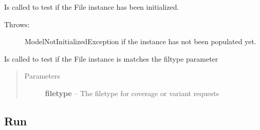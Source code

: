 \documentclass[letterpaper,10pt,english]{sphinxmanual}
\begin{document}
\begin{fulllineitems}
\begin{fulllineitems}
\end{fulllineitems}


\begin{fulllineitems}
\label{Available modules:BaseSpacePy.model.File.File.isInit}
Is called to test if the File instance has been initialized.
\begin{description}
\item[{Throws:}] \leavevmode
ModelNotInitializedException if the instance has not been populated yet.

\end{description}

\end{fulllineitems}


\begin{fulllineitems}
\label{Available modules:BaseSpacePy.model.File.File.isValidFileOption}
Is called to test if the File instance is matches the filtype parameter
\begin{quote}\begin{description}
\item[{Parameters}] \leavevmode
\textbf{filetype} -- The filetype for coverage or variant requests

\end{description}\end{quote}

\end{fulllineitems}


\end{fulllineitems}



\subsection{Run}
\label{Available modules:run}
\end{document}
